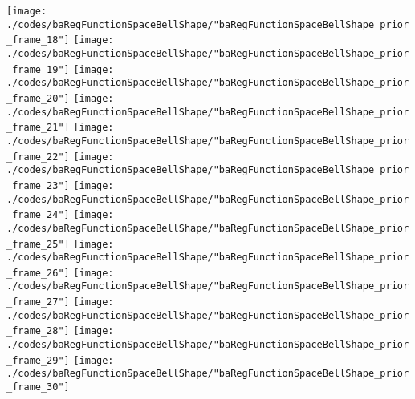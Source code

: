\begin{frame}{\insertsection}
\begin{center}
{\begin{animateinline}{15}
				 \texttt{[image: ./codes/baRegFunctionSpaceBellShape/"baRegFunctionSpaceBellShape\_prior\_frame\_18"]}\newframe
				 \texttt{[image: ./codes/baRegFunctionSpaceBellShape/"baRegFunctionSpaceBellShape\_prior\_frame\_19"]}\newframe
				 \texttt{[image: ./codes/baRegFunctionSpaceBellShape/"baRegFunctionSpaceBellShape\_prior\_frame\_20"]}\newframe
				 \texttt{[image: ./codes/baRegFunctionSpaceBellShape/"baRegFunctionSpaceBellShape\_prior\_frame\_21"]}\newframe
				 \texttt{[image: ./codes/baRegFunctionSpaceBellShape/"baRegFunctionSpaceBellShape\_prior\_frame\_22"]}\newframe
				 \texttt{[image: ./codes/baRegFunctionSpaceBellShape/"baRegFunctionSpaceBellShape\_prior\_frame\_23"]}\newframe
				 \texttt{[image: ./codes/baRegFunctionSpaceBellShape/"baRegFunctionSpaceBellShape\_prior\_frame\_24"]}\newframe
				 \texttt{[image: ./codes/baRegFunctionSpaceBellShape/"baRegFunctionSpaceBellShape\_prior\_frame\_25"]}\newframe
				 \texttt{[image: ./codes/baRegFunctionSpaceBellShape/"baRegFunctionSpaceBellShape\_prior\_frame\_26"]}\newframe
				 \texttt{[image: ./codes/baRegFunctionSpaceBellShape/"baRegFunctionSpaceBellShape\_prior\_frame\_27"]}\newframe
				 \texttt{[image: ./codes/baRegFunctionSpaceBellShape/"baRegFunctionSpaceBellShape\_prior\_frame\_28"]}\newframe
				 \texttt{[image: ./codes/baRegFunctionSpaceBellShape/"baRegFunctionSpaceBellShape\_prior\_frame\_29"]}\newframe
				 \texttt{[image: ./codes/baRegFunctionSpaceBellShape/"baRegFunctionSpaceBellShape\_prior\_frame\_30"]}
			 \end{animateinline}
			}
	\end{center}
    
\end{frame}

